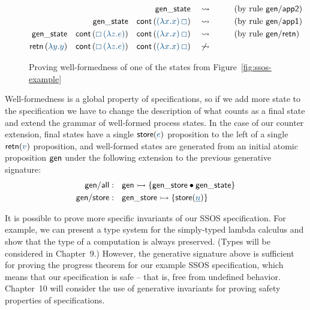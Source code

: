 \begin{figure}
\begin{align*}
{\sf gen\_state}
& ~~~\rightsquigarrow~~ \tag{by rule ${\sf gen/app2}$}\\
{\sf gen\_state} \quad
{\sf cont}\,(\obj{(\lambda x.x)\,\Box})
& ~~~\rightsquigarrow~~ \tag{by rule ${\sf gen/app1}$}\\
{\sf gen\_state} \quad
{\sf cont}\,(\obj{\Box\,(\lambda z.e)}) \quad
{\sf cont}\,(\obj{(\lambda x.x)\,\Box})
& ~~~\rightsquigarrow~~ \tag{by rule ${\sf gen/retn}$}\\
{\sf retn}\,(\obj{\lambda y.y}) \quad
{\sf cont}\,(\obj{\Box\,(\lambda z.e)}) \quad
{\sf cont}\,(\obj{(\lambda x.x)\,\Box})
& ~~~\not\rightsquigarrow~~ 
\end{align*}
\caption{Proving well-formedness of one of the states from
  Figure~\ref{fig:ssos-example}}
\label{fig:ssos-gen}
\end{figure}

Well-formedness is a global property of specifications, so if we add
more state to the specification we have to change the description of
what counts as a final state and extend the grammar of well-formed
process states. In the case of our counter extension, final states
have a single ${\sf store}(\obj{e})$ proposition to the left of a
single ${\sf retn}(\obj{v})$ proposition, and well-formed states are
generated from an initial atomic proposition ${\sf gen}$ under the
following extension to the previous generative signature:
%
\begin{align*}
{\sf gen/all} &:~~ {\sf gen} \lefti \{ {\sf gen\_store} \fuse {\sf
  gen\_state} \}
\\
{\sf gen/store} &:~~ {\sf gen\_store} \lefti \{ {\sf
  store}(\obj{\underline n}) \}
\end{align*}

It is possible to prove more specific invariants of our SSOS
specification. For example, we can present a type system for the
simply-typed lambda calculus and show that the type of a computation
is always preserved. (Types will be considered in Chapter~9.) However,
the generative signature above is sufficient for proving the progress
theorem for our example SSOS specification, which means that our
specification is safe -- that is, free from undefined behavior.
Chapter~10 will consider the use of generative invariants for
proving safety properties of specifications.
